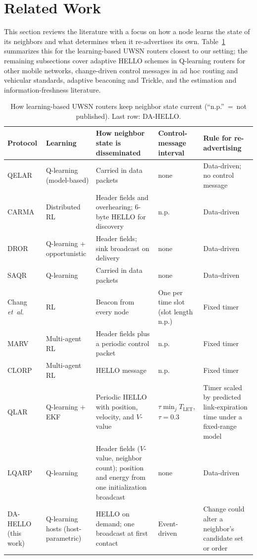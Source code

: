 \section{Related Work}
\label{sec:related}

This section reviews the literature with a focus on how a node learns
the state of its neighbors and what determines when it re-advertises its
own.
Table~\ref{tab:related} summarizes this for the learning-based UWSN
routers closest to our setting; the remaining subsections cover adaptive
HELLO schemes in Q-learning routers for other mobile networks,
change-driven control messages in ad hoc routing and vehicular
standards, adaptive beaconing and Trickle, and the
estimation and information-freshness literature.

\begin{table}[t]
\centering
\caption{How learning-based UWSN routers keep neighbor state current
(``n.p.''~=~not published). Last row: DA-HELLO.}
\label{tab:related}
\scriptsize
\setlength{\tabcolsep}{3pt}
\begin{tabular}{@{}l l p{4.0cm} p{3.2cm} p{4.0cm}@{}}
\hline
Protocol & Learning & How neighbor state is disseminated & Control-message interval & Rule for re-advertising \\
\hline
QELAR \cite{hu2010qelar} & Q-learning (model-based) & Carried in data packets & none & Data-driven; no control message \\
CARMA \cite{divalerio2019carma} & Distributed RL & Header fields and overhearing; 6-byte HELLO for discovery & n.p. & Data-driven \\
DROR \cite{wang2023rldepth} & Q-learning + opportunistic & Header fields; sink broadcast on delivery & none & Data-driven \\
SAQR \cite{zhang2025saqr} & Q-learning & Carried in data packets & none & Data-driven \\
Chang \emph{et~al.} \cite{chang2019passive} & RL & Beacon from every node & One per time slot (slot length n.p.) & Fixed timer \\
MARV \cite{wang2024marv} & Multi-agent RL & Header fields plus a periodic control packet & n.p. & Fixed timer \\
CLORP \cite{liu2024clorP} & Multi-agent RL & HELLO message & n.p. & Fixed timer \\
QLAR \cite{li2025qlar} & Q-learning + EKF & Periodic HELLO with position, velocity, and $V$-value & $\tau\min_j T_{\mathrm{LET}}$, $\tau=0.3$ & Timer scaled by predicted link-expiration time under a fixed-range model \\
LQARP \cite{liu2026lqarp} & Q-learning & Header fields ($V$-value, neighbor count); position and energy from one initialization broadcast & none & Data-driven \\
\hline
DA-HELLO (this work) & Q-learning hosts (host-parametric) & HELLO on demand; one broadcast at first contact & Event-driven & Change could alter a neighbor's candidate set or order \\
\hline
\end{tabular}

\end{table}

